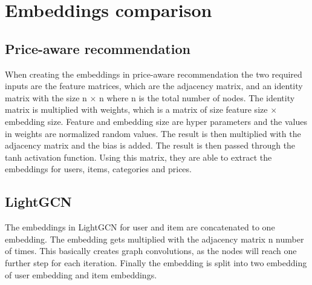\section{Embeddings comparison}
\subsection{Price-aware recommendation}
When creating the embeddings in price-aware recommendation the two required inputs are the feature matrices, which are the adjacency matrix, and an identity matrix with the size n $\times$ n where n is the total number of nodes.
The identity matrix is multiplied with weights, which is a matrix of size feature size $\times$ embedding size. 
Feature and embedding size are hyper parameters and the values in weights are normalized random values.
The result is then multiplied with the adjacency matrix and the bias is added.
The result is then passed through the tanh activation function.
Using this matrix, they are able to extract the embeddings for users, items, categories and prices.

\subsection{LightGCN}
The embeddings in LightGCN for user and item are concatenated to one embedding.
The embedding gets multiplied with the adjacency matrix n number of times.
This basically creates graph convolutions, as the nodes will reach one further step for each iteration.
Finally the embedding is split into two embedding of user embedding and item embeddings.
